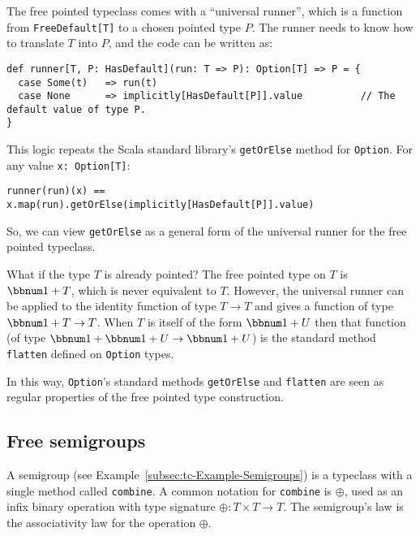 The free pointed typeclass comes with a \textsf{``}universal runner\textsf{''}, which
is a function from \lstinline!FreeDefault[T]!
to a chosen pointed type $P$. The runner needs to know how to translate
$T$ into $P$, and the code can be written as:
\begin{lstlisting}
def runner[T, P: HasDefault](run: T => P): Option[T] => P = {
  case Some(t)   => run(t)
  case None      => implicitly[HasDefault[P]].value          // The default value of type P.
}
\end{lstlisting}
This logic repeats the Scala standard library\textsf{'}s \lstinline!getOrElse!
method for \lstinline!Option!.
For any value \lstinline!x: Option[T]!:
\begin{lstlisting}
runner(run)(x) == x.map(run).getOrElse(implicitly[HasDefault[P]].value)
\end{lstlisting}
So, we can view \lstinline!getOrElse!
as a general form of the universal runner for the free pointed typeclass.

What if the type $T$ is already pointed? The free pointed type on
$T$ is $\bbnum 1+T$, which is never equivalent to $T$. However,
the universal runner can be applied to the identity function of type
$T\rightarrow T$ and gives a function of type $\bbnum 1+T\rightarrow T$.
When $T$ is itself of the form $\bbnum 1+U$ then that function (of
type $\bbnum 1+\bbnum 1+U\rightarrow\bbnum 1+U$) is the standard
method \lstinline!flatten!
defined on \lstinline!Option!
types.

In this way, \lstinline!Option!\textsf{'}s
standard methods \lstinline!getOrElse!
and \lstinline!flatten!
are seen as regular properties of the free pointed type construction.

\subsection{Free semigroups}

A semigroup (see Example~\ref{subsec:tc-Example-Semigroups}) is
a typeclass with a single method called \lstinline!combine!.
A common notation for \lstinline!combine!
is $\oplus$, used as an infix binary operation with type signature
$\oplus:T\times T\rightarrow T$. The semigroup\textsf{'}s law is the associativity
law for the operation $\oplus$.


